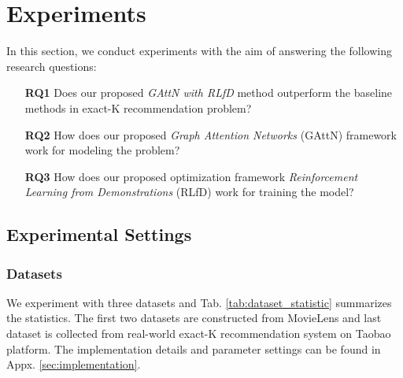 \section{Experiments}
\label{sec:experiments}
In this section, we conduct experiments with the aim of
answering the following research questions:
\begin{enumerate}
\item[\textbf{RQ1}] Does our proposed \emph{GAttN with RLfD} method outperform the baseline methods in exact-K recommendation problem?
\item[\textbf{RQ2}] How does our proposed \emph{Graph Attention Networks} (GAttN) framework work for modeling the problem?
\item[\textbf{RQ3}] How does our proposed optimization framework \emph{Reinforcement Learning from Demonstrations} (RLfD) work for training the model?
\end{enumerate}
\subsection{Experimental Settings}
\subsubsection{Datasets}
We experiment with three datasets and Tab. \ref{tab:dataset_statistic} summarizes the statistics.
The first two datasets are constructed from MovieLens
and last dataset is collected from real-world exact-K recommendation system on Taobao platform.
The implementation details and parameter settings can be found in Appx. \ref{sec:implementation}.

